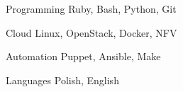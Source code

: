 

\begin{cvskills}

  \cvskill
    {Programming} %
    {Ruby, Bash, Python, Git} %

  \cvskill
    {Cloud} %
    {Linux, OpenStack, Docker, NFV} %

  \cvskill
    {Automation} %
    {Puppet, Ansible, Make} %

  \cvskill
    {Languages} %
    {Polish, English} %

\end{cvskills}
